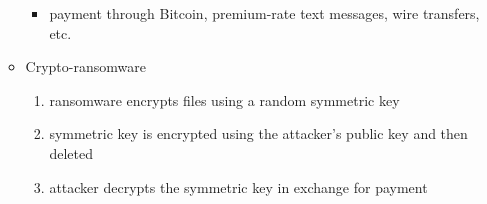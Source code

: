 \documentclass[final]{article}
\begin{document}
\begin{itemize}[nosep]
\begin{itemize}
\begin{itemize}[nosep]
                        \item payment through Bitcoin, premium-rate text messages, wire transfers, etc.
                    \end{itemize}
              \item Crypto-ransomware
                    \begin{enumerate}[nosep]
                        \item ransomware encrypts files using a random symmetric key
                        \item symmetric key is encrypted using the attacker's public key and then deleted
                        \item attacker decrypts the symmetric key in exchange for payment
                    \end{enumerate}
          \end{itemize}
\end{itemize}
\end{document}
